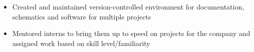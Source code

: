 \begin{cventries}
{\begin{cvitems}
{				\begin{itemize}[noitemsep,wide=0pt, leftmargin=\dimexpr{} + 2\relax]
					\item[\textbullet]{Created and maintained version-controlled environment for documentation, schematics and software for multiple projects}
					\item[\textbullet]{Mentored interns to bring them up to speed on projects for the company and assigned work based on skill level/familiarity}
				\end{itemize}}
		\end{cvitems}
	}
\end{cventries}
